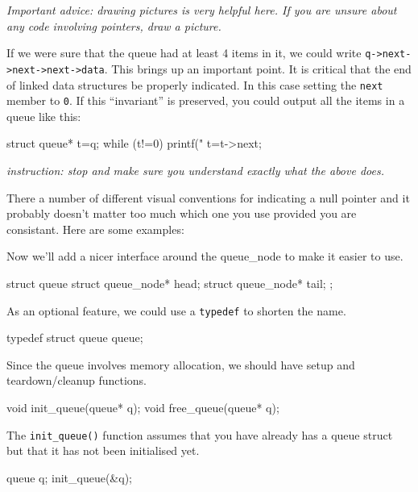 \begin{center}
\end{center}

\emph{Important advice:  drawing pictures is very helpful here. If you are unsure about any code involving pointers, draw a picture.}

If we were sure that the queue had at least 4 items in it, we could write \lstinline!q->next->next->next->data!.
This brings up an important point.
It is critical that the end of linked data structures be properly indicated.
In this case setting the \texttt{next} member to \texttt{0}.
If this ``invariant'' is preserved, you could output all the items in a queue like this:
\begin{codeinline}
struct queue* t=q;
while (t!=0) {
    printf("%
    t=t->next;
}
\end{codeinline}

\emph{instruction: stop and make sure you understand exactly what the above does.}

There a number of different visual conventions for indicating a null pointer and it probably doesn't 
matter too much which one you use provided you are consistant. 
Here are some examples:

\begin{center}
\end{center}



Now we'll add a nicer interface around the queue\_node to make it easier to use.

\begin{codeinline}
struct queue {
    struct queue_node* head;
    struct queue_node* tail;
};
\end{codeinline}

As an optional feature, we could use a \texttt{typedef} to shorten the name.
\begin{codeinline}
typedef struct queue queue;
\end{codeinline}

Since the queue involves memory allocation, we should have setup and teardown/cleanup functions.
\begin{codeinline}
void init_queue(queue* q);
void free_queue(queue* q);
\end{codeinline}
The \lstinline!init_queue()! function assumes that you have already has a queue struct but that it has not been initialised yet.
\begin{codeinline}
queue q;
init_queue(&q);
\end{codeinline}

